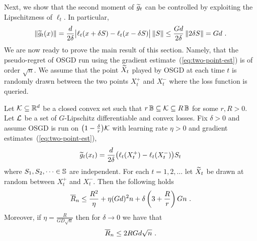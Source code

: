 %
Next, we show that the second moment of $\widetilde{g}_t$ can be controlled by exploiting the Lipschitzness of $\ell_t$. In particular,
\begin{align*}
    \left\|{\widetilde{g}_t(x)}\right\|
=
    \frac{d}{2\delta}\bigl|\ell_t(x + \delta S) - \ell_t(x - \delta S)\bigr|\left\|{S}\right\|
\le
    \frac{Gd}{2\delta}\left\|{2\delta S}\right\|
=
    Gd~.
\end{align*}
%
We are now ready to prove the main result of this section. Namely, that the pseudo-regret of OSGD run using the gradient estimate~(\ref{eq:two-point-est}) is of order $\sqrt{n}$. We assume that the point $\widetilde{X}_t$ played by OSGD at each time $t$ is randomly drawn between the two points $X_t^+$ and $X_t^-$ where the loss function is queried.
%
\begin{theorem}
\label{th:two-point}
Let $\mathcal{K}\subseteq\mathbb{R}^d$ be a closed convex set such that $r\,\mathbb{B}\subseteq\mathcal{K}\subseteq R\,\mathbb{B}$ for some $r,R > 0$. 
%
Let $\mathcal{L}$ be a set of $G$-Lipschitz differentiable and convex losses.
%
Fix $\delta > 0$ and assume OSGD is run on $\bigl(1-\tfrac{\delta}{r}\bigr)\mathcal{K}$ with learning rate $\eta > 0$ and gradient estimates~(\ref{eq:two-point-est}),
\[
    \widetilde{g}_t(x_t) = \frac{d}{2\delta}\bigl( \ell_t(X_t^+) - \ell_t(X_t^-) \bigr)S_t
\]
where $S_1,S_2,\dots\in\mathbb{S}$ are independent. For each $t=1,2,\dots$ let $\widetilde{X}_t$ be drawn at random between $X_t^+$ and $X_t^-$. Then
the following holds
\[
\overline{R}_n
\le
    \frac{R^2}{\eta} + \eta (Gd)^2 n + \delta\left(3 + \frac{R}{r} \right) G n~.
\]
Moreover, if $\eta = \tfrac{R}{GD\sqrt{n}}$ then for $\delta\to 0$ we have that
\[
\overline{R}_n
\le
    2RGd\sqrt{n}~.
\]
\end{theorem}
%
